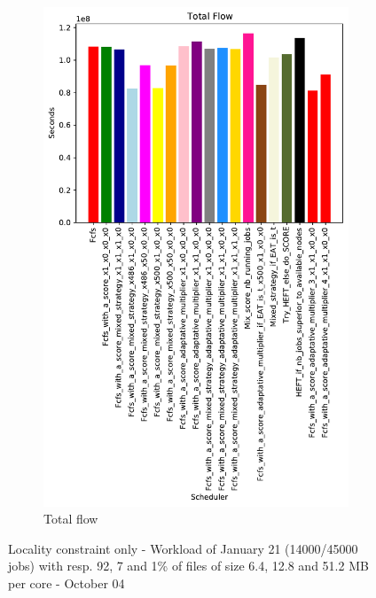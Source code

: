 \documentclass[a4paper]{article}
\begin{document}
\begin{figure}[H]
\begin{subfigure}[b]{0.4\linewidth}\centering\includegraphics[width=0.9\linewidth]{MBSS/plot/Results_FCFS_Score_Adaptative_Multiplier_2022-01-21->2022-01-21_V9271_Total_flow_450_128_32_256_4_1024.pdf}\caption{Total flow}\end{subfigure}
\caption{Locality constraint only - Workload of January 21 (14000/45000 jobs) with resp. 92, 7 and 1\% of files of size 6.4, 12.8 and 51.2 MB per core - October 04}\end{figure}
\end{document}
